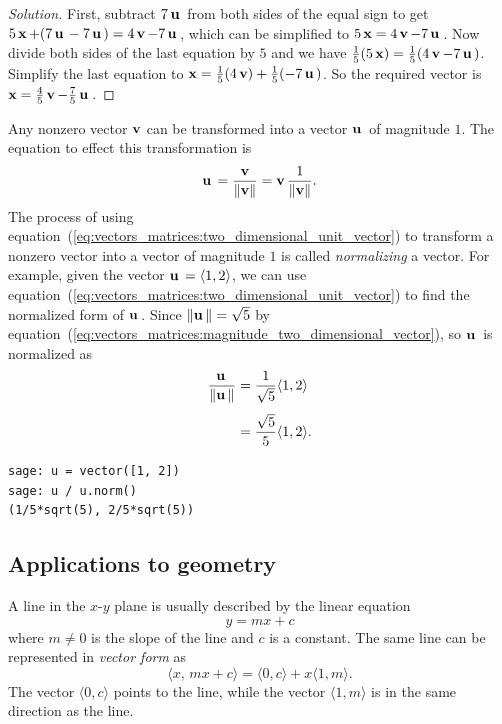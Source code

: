 \begin{proof}[Solution]
First, subtract $7\operatorname*{\mathbf{u}}{}$ from both sides of the equal sign to get
$5\operatorname*{\mathbf{x}} + (7\operatorname*{\mathbf{u}}{} - 7\operatorname*{\mathbf{u}}{}) = 4\operatorname*{\mathbf{v}} - 7\operatorname*{\mathbf{u}}{}$, which can be
simplified to $5\operatorname*{\mathbf{x}} = 4\operatorname*{\mathbf{v}} - 7\operatorname*{\mathbf{u}}{}$. Now divide both sides of
the last equation by $5$ and we have
$\frac{1}{5} (5\operatorname*{\mathbf{x}}) = \frac{1}{5} (4\operatorname*{\mathbf{v}} - 7\operatorname*{\mathbf{u}}{})$. Simplify the
last equation to
$\operatorname*{\mathbf{x}} = \frac{1}{5} (4\operatorname*{\mathbf{v}}) + \frac{1}{5}(-7\operatorname*{\mathbf{u}}{})$. So the required
vector is $\operatorname*{\mathbf{x}} = \frac{4}{5}\operatorname*{\mathbf{v}} - \frac{7}{5}\operatorname*{\mathbf{u}}{}$.
\end{proof}

Any nonzero vector $\operatorname*{\mathbf{v}}$ can be transformed into a vector $\operatorname*{\mathbf{u}}{}$ of
magnitude $1$. The equation to effect this
transformation is
%
\begin{equation}
\label{eq:vectors_matrices:two_dimensional_unit_vector}
\operatorname*{\mathbf{u}}{}
=
\frac {\operatorname*{\mathbf{v}}} {\left\Arrowvert \operatorname*{\mathbf{v}} \right\Arrowvert}
=
\operatorname*{\mathbf{v}}
\frac {1} {\left\Arrowvert \operatorname*{\mathbf{v}} \right\Arrowvert}.
\end{equation}
%
The process of using
equation~(\ref{eq:vectors_matrices:two_dimensional_unit_vector}) to
transform a nonzero vector into a vector of magnitude $1$ is called
\emph{normalizing}
 a vector. For example, given the vector
$\operatorname*{\mathbf{u}}{} = \langle 1, 2 \rangle$, we can use
equation~(\ref{eq:vectors_matrices:two_dimensional_unit_vector}) to
find the normalized form of $\operatorname*{\mathbf{u}}{}$. Since
$\left\Arrowvert \operatorname*{\mathbf{u}}{} \right\Arrowvert = \sqrt{5}$ by
equation~(\ref{eq:vectors_matrices:magnitude_two_dimensional_vector}),
so $\operatorname*{\mathbf{u}}{}$ is normalized as
%
\begin{align*}
\frac {\operatorname*{\mathbf{u}}{}} {\left\Arrowvert \operatorname*{\mathbf{u}}{} \right\Arrowvert}
&=
\frac{1}{\sqrt{5}} \langle 1, 2 \rangle \\[4pt]
&=
\frac{\sqrt{5}}{5} \langle 1, 2 \rangle.
\end{align*}

\begin{lstlisting}
sage: u = vector([1, 2])
sage: u / u.norm()
(1/5*sqrt(5), 2/5*sqrt(5))
\end{lstlisting}



\subsection{Applications to geometry}
\label{subsec:2D_vectors_apply_geometry}

A line in the $x$-$y$ plane is usually described by the
linear equation
\[
y = mx + c
\]
where $m \neq 0$ is the slope of the line and $c$ is a constant. The
same line can be represented in \emph{vector form}
as
%
\begin{equation}
\label{eq:vector_form_line}
\langle x,\, mx + c \rangle
=
\langle 0, c \rangle + x \langle 1, m \rangle.
\end{equation}
%
The vector $\langle 0, c \rangle$ points to the line, while the vector
$\langle 1, m \rangle$ is in the same direction as the line.

